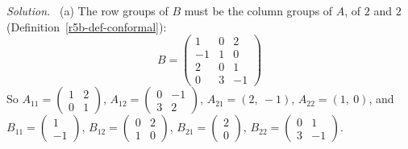 \documentclass[12pt]{article}
\theoremstyle{definition}
\newenvironment{solution}{\par\noindent\textit{Solution.}\ }{\par\smallskip}
\begin{document}
\begin{solution}
(a) The row groups of \(B\) must be the column groups of \(A\), of \(2\) and \(2\) (Definition~\ref{r5b-def-conformal}):
\[
B=\left(\begin{array}{c|cc}1&0&2\\-1&1&0\\\hline2&0&1\\0&3&-1\end{array}\right)
\]
So \(A_{11}=\left(\begin{smallmatrix}1&2\\0&1\end{smallmatrix}\right)\),
\(A_{12}=\left(\begin{smallmatrix}0&-1\\3&2\end{smallmatrix}\right)\), \(A_{21}=(2,\ -1)\), \(A_{22}=(1,\ 0)\), and
\(B_{11}=\left(\begin{smallmatrix}1\\-1\end{smallmatrix}\right)\),
\(B_{12}=\left(\begin{smallmatrix}0&2\\1&0\end{smallmatrix}\right)\),
\(B_{21}=\left(\begin{smallmatrix}2\\0\end{smallmatrix}\right)\),
\(B_{22}=\left(\begin{smallmatrix}0&1\\3&-1\end{smallmatrix}\right)\).


\end{solution}
\end{document}
